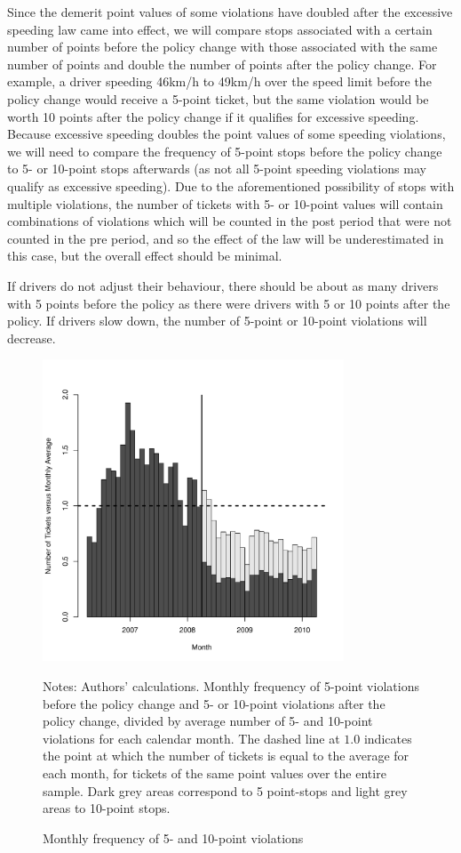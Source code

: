 Since the demerit point values of some violations have doubled 
after the excessive speeding law came into effect, 
% 
we will compare stops associated with a certain number of points 
before the policy change with those associated with the 
same number of points and double the number of points after the policy change. 
For example, a driver speeding 46km/h to 49km/h over the speed limit 
before the policy change would receive a 5-point ticket, 
but the same violation would be worth 10 points after the policy change 
if it qualifies for excessive speeding. 
Because excessive speeding doubles the point values of some speeding violations, 
we will need to compare the frequency of 5-point stops before the policy change 
to 5- or 10-point stops afterwards 
(as not all 5-point speeding violations may qualify as excessive speeding). 
Due to the aforementioned possibility of stops with multiple violations, 
the number of tickets with 5- or 10-point values will contain 
combinations of violations which will be counted in the post period 
that were not counted in the pre period, and so the effect of the law 
will be underestimated in this case, but the overall effect should be minimal.

If drivers do not adjust their behaviour, 
there should be about as many drivers with 5 points before the policy 
as there were drivers with 5 or 10 points after the policy. 
If drivers slow down, the number of 5-point or 10-point violations will decrease. 


\begin{figure}
\centering
\includegraphics[width=0.8\textwidth]{Figures/num_pts_5_10_all}
\caption{Monthly frequency of 5- and 10-point violations }
Notes: Authors' calculations. 
Monthly frequency of 5-point violations before the policy change 
and 5- or 10-point violations after the policy change, 
divided by average number of 5- and 10-point violations
for each calendar month. 
% 
The dashed line at $1.0$ indicates the point at which 
the number of tickets is equal to the average for each month, 
for tickets of the same point values over the entire sample.
% 
Dark grey areas correspond to 5 point-stops and light grey areas to 10-point stops.
\label{fig:num_pts_5_10_all}
\end{figure}


